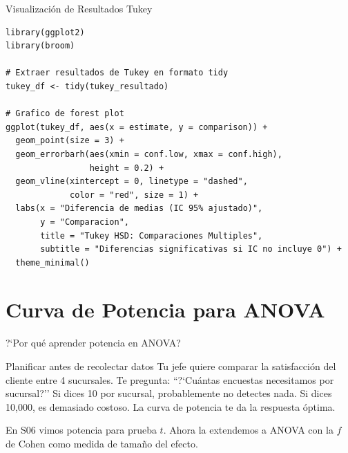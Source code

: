 \documentclass[aspectratio=169, 11pt]{beamer}
\begin{document}
\begin{frame}[fragile]{Visualización de Resultados Tukey}
\begin{lstlisting}
library(ggplot2)
library(broom)

# Extraer resultados de Tukey en formato tidy
tukey_df <- tidy(tukey_resultado)

# Grafico de forest plot
ggplot(tukey_df, aes(x = estimate, y = comparison)) +
  geom_point(size = 3) +
  geom_errorbarh(aes(xmin = conf.low, xmax = conf.high),
                 height = 0.2) +
  geom_vline(xintercept = 0, linetype = "dashed",
             color = "red", size = 1) +
  labs(x = "Diferencia de medias (IC 95% ajustado)",
       y = "Comparacion",
       title = "Tukey HSD: Comparaciones Multiples",
       subtitle = "Diferencias significativas si IC no incluye 0") +
  theme_minimal()
\end{lstlisting}
\end{frame}

\section{Curva de Potencia para ANOVA}

\begin{frame}{?`Por qu\'e aprender potencia en ANOVA?}
\small
\begin{exampleblock}{Planificar antes de recolectar datos}
Tu jefe quiere comparar la satisfacci\'on del cliente entre 4 sucursales. Te pregunta: ``?`Cu\'antas encuestas necesitamos por sucursal?'' Si dices 10 por sucursal, probablemente no detectes nada. Si dices 10{,}000, es demasiado costoso. La curva de potencia te da la respuesta \'optima.
\end{exampleblock}

\vspace{0.2cm}
En S06 vimos potencia para prueba $t$. Ahora la extendemos a ANOVA con la $f$ de Cohen como medida de tama\~no del efecto.
\end{frame}
\end{document}

